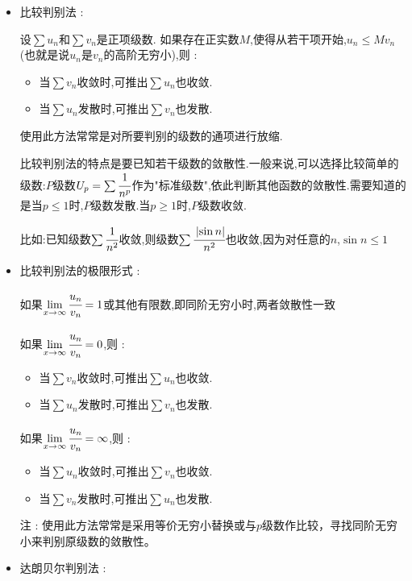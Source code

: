 \documentclass[UTF8,12pt]{ctexbook}
\newcommand{\limNormal}[1]{\lim\limits_{#1}}
\newcommand{\myLimToInf}{\limNormal{x \to \infty}}
\newcommand{\absoluteValue}[1]{\left\lvert #1 \right\vert}
\begin{document}
{{{{{    \begin{itemize}
      \item {
            比较判别法 :

            设$\sum u_n$和$\sum v_n$是正项级数.
            如果存在正实数$M$,使得从若干项开始,$u_n \leq Mv_n$(也就是说$u_n$是$v_n$的高阶无穷小),则 :
            \begin{itemize}
              \item 当$\sum v_n$收敛时,可推出$\sum u_n$也收敛.
              \item 当$\sum u_n$发散时,可推出$\sum v_n$也发散.
            \end{itemize}

            使用此方法常常是对所要判别的级数的通项进行放缩.

            比较判别法的特点是要已知若干级数的敛散性.一般来说,可以选择比较简单的级数:$P$级数$U_p = \sum\cfrac{1}{n^p}$作为"标准级数",依此判断其他函数的敛散性.需要知道的是当$p \leq 1$时,$P$级数发散.当$p \geq 1$时,$P$级数收敛.

            比如:已知级数$\sum \cfrac{1}{n^2}$收敛,则级数$\sum \cfrac{\absoluteValue{\sin n}}{n^2}$也收敛,因为对任意的$n$,$\sin n \leq 1$
            }
      \item{
            比较判别法的极限形式 :

            如果$\myLimToInf\cfrac{u_n}{v_n} = 1$或其他有限数,即同阶无穷小时,两者敛散性一致

            如果$\myLimToInf\cfrac{u_n}{v_n} = 0$,则 :
            \begin{itemize}
              \item 当$\sum v_n$收敛时,可推出$\sum u_n$也收敛.
              \item 当$\sum u_n$发散时,可推出$\sum v_n$也发散.
            \end{itemize}

            如果$\myLimToInf\cfrac{u_n}{v_n} = \infty$,则 :
            \begin{itemize}
              \item 当$\sum u_n$收敛时,可推出$\sum v_n$也收敛.
              \item 当$\sum v_n$发散时,可推出$\sum u_n$也发散.
            \end{itemize}

            注 : 使用此方法常常是采用等价无穷小替换或与$p$级数作比较，寻找同阶无穷小来判别原级数的敛散性。
            }
      \item{
            达朗贝尔判别法 :

}
\end{itemize}}}}}}
\end{document}
